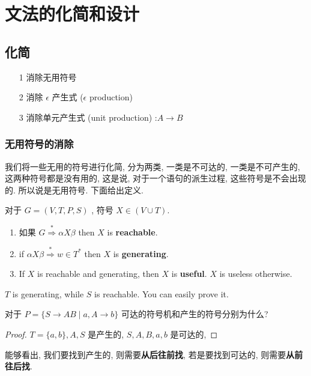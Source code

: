 \documentclass[../main.tex]{subfiles}
\begin{document}

\section{文法的化简和设计}
\label{sec:文法的化简和设计}
\subsection{化简}

\begin{itemize}
\item [1] 
消除无用符号
\item [2] 
消除 \( \epsilon\) 产生式 (\( \epsilon\) production)
\item [3] 
消除单元产生式 (unit production) :\(A \to B\)
\end{itemize}

\subsubsection{无用符号的消除}
我们将一些无用的符号进行化简, 分为两类, 一类是不可达的, 一类是不可产生的, 这两种符号都是没有用的, 这是说, 对于一个语句的派生过程, 这些符号是不会出现的. 所以说是无用符号. 下面给出定义. 
\begin{definition}[Useful]\label{def:Useful}
对于 \(G = (V , T , P , S)\) , 符号 \(X \in (V \cup T )\). 
\begin{enumerate}
\item  如果 \(G \overset{*}{\Rightarrow}\alpha X\beta\) then \(X\) is \textbf{reachable}. 
\item  if \(\alpha X\beta \overset{*}{\Rightarrow} w \in T ^{*}\)  then \(X\) is \textbf{generating}. 
\item  If \(X\) is reachable and generating, then \(X\) is \textbf{useful}. \(X\) is useless otherwise. 
\end{enumerate}
\end{definition}
\begin{remark}
\(T\) is generating, while \(S\) is reachable. You can easily prove it.
\end{remark}

\begin{exam}
	对于 \(P =\{ S \to A B \mid a , A \to b\} \)
	可达的符号机和产生的符号分别为什么? 
\end{exam}
\begin{proof}
	\(T = \{ a, b \} , A, S\) 是产生的, \(S , A , B , a, b\) 是可达的, 
\end{proof}
\begin{remark}
能够看出, 我们要找到产生的, 则需要\textbf{从后往前找}, 若是要找到可达的, 则需要\textbf{从前往后找}. 
\end{remark}
\end{document}
